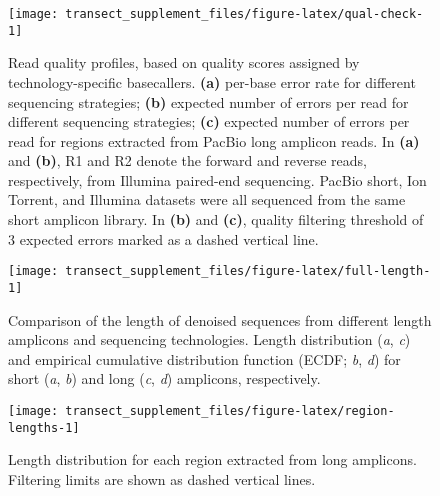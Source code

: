 \documentclass[
]{article}
\begin{document}
\begin{figure}

{\centering \texttt{[image: transect\_supplement\_files/figure-latex/qual-check-1]} 

}

\caption[Read quality profiles]{Read quality profiles, based on quality scores assigned by technology-specific basecallers. \textbf{(a)} per-base error rate for different sequencing strategies; \textbf{(b)} expected number of errors per read for different sequencing strategies; \textbf{(c)} expected number of errors per read for regions extracted from PacBio long amplicon reads. In \textbf{(a)} and \textbf{(b)}, R1 and R2 denote the forward and reverse reads, respectively, from Illumina paired-end sequencing. PacBio short, Ion Torrent, and Illumina datasets were all sequenced from the same short amplicon library. In \textbf{(b)} and \textbf{(c)}, quality filtering threshold of 3 expected errors marked as a dashed vertical line.}\label{fig:qual-check}
\end{figure}





\begin{figure}

{\centering \texttt{[image: transect\_supplement\_files/figure-latex/full-length-1]} 

}

\caption[Comparison of the length of denoised sequences from different length amplicons and sequencing technologies]{Comparison of the length of denoised sequences from different length amplicons and sequencing technologies. Length distribution (\emph{a}, \emph{c}) and empirical cumulative distribution function (ECDF; \emph{b}, \emph{d}) for short (\emph{a}, \emph{b}) and long (\emph{c}, \emph{d}) amplicons, respectively.}\label{fig:full-length}
\end{figure}





\begin{figure}

{\centering \texttt{[image: transect\_supplement\_files/figure-latex/region-lengths-1]} 

}

\caption[Length distribution for each region extracted from long amplicons]{Length distribution for each region extracted from long amplicons. Filtering limits are shown as dashed vertical lines.}\label{fig:region-lengths}
\end{figure}
\end{document}
